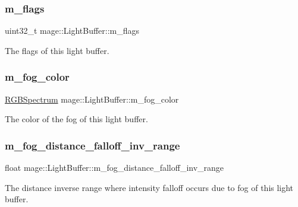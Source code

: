 \subsubsection{\texorpdfstring{m\+\_\+flags}{m\_flags}}
{\footnotesize\ttfamily uint32\+\_\+t mage\+::\+Light\+Buffer\+::m\+\_\+flags}

The flags of this light buffer. \hypertarget{structmage_1_1_light_buffer_aa33b98b2880c519eb5be09f78ce4581e}{}\label{structmage_1_1_light_buffer_aa33b98b2880c519eb5be09f78ce4581e} 
\subsubsection{\texorpdfstring{m\+\_\+fog\+\_\+color}{m\_fog\_color}}
{\footnotesize\ttfamily \hyperlink{structmage_1_1_r_g_b_spectrum}{R\+G\+B\+Spectrum} mage\+::\+Light\+Buffer\+::m\+\_\+fog\+\_\+color}

The color of the fog of this light buffer. \hypertarget{structmage_1_1_light_buffer_a730c9c5c1e48f148aa51ebfd8523a347}{}\label{structmage_1_1_light_buffer_a730c9c5c1e48f148aa51ebfd8523a347} 
\subsubsection{\texorpdfstring{m\+\_\+fog\+\_\+distance\+\_\+falloff\+\_\+inv\+\_\+range}{m\_fog\_distance\_falloff\_inv\_range}}
{\footnotesize\ttfamily float mage\+::\+Light\+Buffer\+::m\+\_\+fog\+\_\+distance\+\_\+falloff\+\_\+inv\+\_\+range}

The distance inverse range where intensity falloff occurs due to fog of this light buffer. \hypertarget{structmage_1_1_light_buffer_ae7f24ab3b764ad3c2db5a95788379628}{}\label{structmage_1_1_light_buffer_ae7f24ab3b764ad3c2db5a95788379628} 
